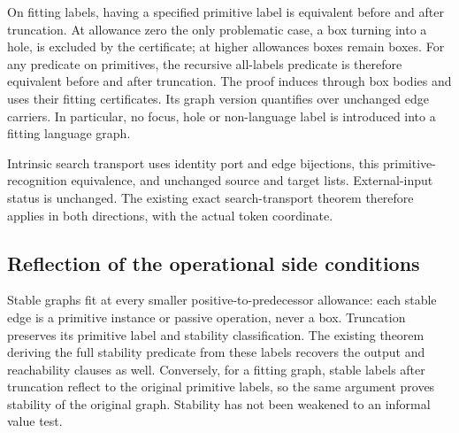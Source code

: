 




On fitting labels, having a specified primitive label is equivalent
before and after truncation. At allowance zero the only problematic case,
a box turning into a hole, is excluded by the certificate; at higher allowances
boxes remain boxes. For any predicate on primitives, the recursive all-labels
predicate is therefore equivalent before and after truncation. The proof
induces through box bodies and uses their fitting certificates. Its graph
version quantifies over unchanged edge carriers. In particular, no focus,
hole or non-language label is introduced into a fitting language graph.

Intrinsic search transport uses identity port and edge bijections, this
primitive-recognition equivalence, and unchanged source and target lists.
External-input status is unchanged. The existing exact search-transport
theorem therefore applies in both directions, with the actual token coordinate.





\subsection{Reflection of the operational side conditions}

Stable graphs fit at every smaller positive-to-predecessor allowance:
each stable edge is a primitive instance or passive operation, never a box.
Truncation preserves its primitive label and stability classification. The
existing theorem deriving the full stability predicate from these labels
recovers the output and reachability clauses as well. Conversely, for a fitting
graph, stable labels after truncation reflect to the original primitive labels,
so the same argument proves stability of the original graph. Stability has not
been weakened to an informal value test.


